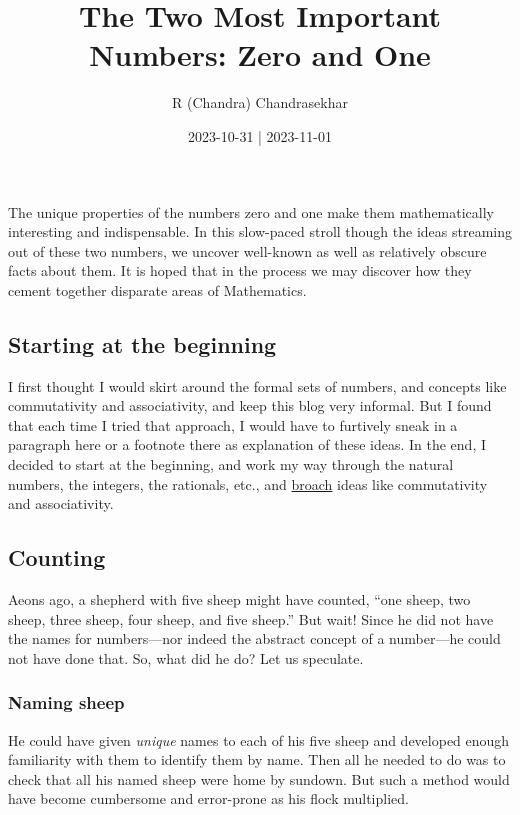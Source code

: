 \documentclass[
  a4paper,
]{article}
\title{The Two Most Important Numbers: Zero and One}
\author{R (Chandra) Chandrasekhar}
\date{2023-10-31 | 2023-11-01}
\begin{document}
\maketitle

\thispagestyle{empty}


The unique properties of the numbers zero and one make them
mathematically interesting and indispensable. In this slow-paced stroll
though the ideas streaming out of these two numbers, we uncover
well-known as well as relatively obscure facts about them. It is hoped
that in the process we may discover how they cement together disparate
areas of Mathematics.

\hypertarget{starting-at-the-beginning}{%
\subsection{Starting at the beginning}\label{starting-at-the-beginning}}

I first thought I would skirt around the formal sets of numbers, and
concepts like commutativity and associativity, and keep this blog very
informal. But I found that each time I tried that approach, I would have
to furtively sneak in a paragraph here or a footnote there as
explanation of these ideas. In the end, I decided to start at the
beginning, and work my way through the natural numbers, the integers,
the rationals, etc., and
\href{https://www.thefreedictionary.com/broach}{broach} ideas like
commutativity and associativity.

\hypertarget{counting}{%
\subsection{Counting}\label{counting}}

Aeons ago, a shepherd with five sheep might have counted, ``one sheep,
two sheep, three sheep, four sheep, and five sheep.'' But wait! Since he
did not have the names for numbers---nor indeed the abstract concept of
a number---he could not have done that. So, what did he do? Let us
speculate.

\hypertarget{naming-sheep}{%
\subsubsection{Naming sheep}\label{naming-sheep}}

He could have given \emph{unique} names to each of his five sheep and
developed enough familiarity with them to identify them by name. Then
all he needed to do was to check that all his named sheep were home by
sundown. But such a method would have become cumbersome and error-prone
as his flock multiplied.
\end{document}
